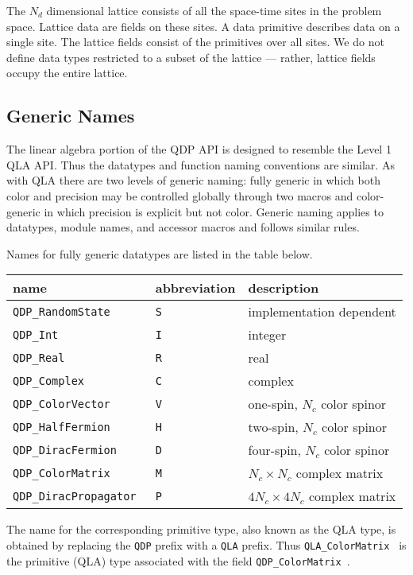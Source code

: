 \documentclass{article}
\newcommand{\tReal}{QDP\ttdash Real }
\newcommand{\tComplex}{QDP\ttdash Complex }
\newcommand{\tInt}{QDP\ttdash Int }
\newcommand{\tColorMatrix}{QDP\ttdash ColorMatrix }
\newcommand{\tHalfFermion}{QDP\ttdash HalfFermion }
\newcommand{\tDiracFermion}{QDP\ttdash DiracFermion }
\newcommand{\tColorVector}{QDP\ttdash ColorVector }
\newcommand{\tDiracPropagator}{QDP\ttdash DiracPropagator }
\newcommand{\tRandomState}{QDP\ttdash RandomState }
\newcommand{\tqlaColorMatrix}{QLA\ttdash ColorMatrix }
\newcommand{\ttdash}{{\tt \_}}
\begin{document}
The $N_d$ dimensional lattice consists of all the space-time sites in
the problem space.  Lattice data are fields on these sites.  A data
primitive describes data on a single site.  The lattice fields consist
of the primitives over all sites.  We do not define data types
restricted to a subset of the lattice --- rather, lattice fields occupy
the entire lattice.

\subsection{Generic Names}

The linear algebra portion of the QDP API is designed to resemble the
Level 1 QLA API.  Thus the datatypes and function naming conventions
are similar.  As with QLA there are two levels of generic naming:
fully generic in which both color and precision may be controlled
globally through two macros and color-generic in which precision is
explicit but not color.  Generic naming applies to datatypes, module
names, and accessor macros and follows similar rules.

Names for fully generic datatypes are listed in the table below.
\begin{center}
\begin{tabular}{|l|l|l|}
\hline
name                      & abbreviation & description \\
\hline
{\tt \tRandomState        } & {\tt S} & implementation dependent \\
{\tt \tInt                } & {\tt I} & integer \\
{\tt \tReal               } & {\tt R} & real \\
{\tt \tComplex            } & {\tt C} & complex \\
{\tt \tColorVector        } & {\tt V} & one-spin,  $N_c$ color spinor \\
{\tt \tHalfFermion        } & {\tt H} & two-spin, $N_c$ color spinor \\
{\tt \tDiracFermion       } & {\tt D} & four-spin, $N_c$ color spinor \\
{\tt \tColorMatrix        } & {\tt M} & $N_c \times N_c$ complex matrix \\
{\tt \tDiracPropagator    } & {\tt P} & $4N_c \times 4N_c$ complex matrix \\
\hline
\end{tabular}
\end{center}
%
The name for the corresponding primitive type, also known as the QLA
type, is obtained by replacing the {\tt QDP} prefix with a {\tt QLA}
prefix.  Thus {\tt \tqlaColorMatrix} is the primitive (QLA) type associated
with the field {\tt \tColorMatrix}.
\end{document}
